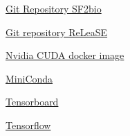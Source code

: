 \documentclass[a4paper]{article}
\begin{document}
\begin{thebibliography}{1}
\href{https://github.com/IvanBuccella/SF2Bio#installation}{Git Repository SF2bio}

\href{https://github.com/isayev/ReLeaSE#installation-with-anaconda}{Git repository ReLeaSE} 

\href{https://hub.docker.com/r/nvidia/cuda}{Nvidia CUDA docker image}

\href{https://docs.conda.io/en/latest/miniconda.html}{MiniConda} 

\href{https://www.tensorflow.org/tensorboard}{Tensorboard} 

\href{https://www.tensorflow.org/}{Tensorflow} 

\end{thebibliography}
\end{document}
